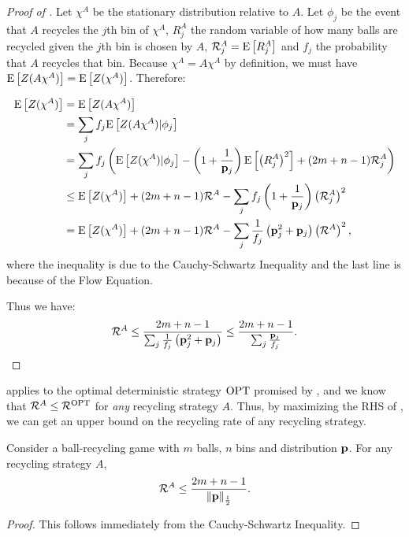 \begin{proof}[Proof of ]
	Let $\chi^A$ be the stationary distribution relative to $A$. Let $\phi_j$
	be the event that $A$ recycles the $j$th bin of $\chi^A$, $R_j^A$ the
	random variable of how many balls are recycled given the $j$th bin is
	chosen by $A$, $\mathcal{R}_j^A=\mathrm{E}\left[R_j^A\right]$ and $f_j$ the probability that
	$A$ recycles that bin.  Because $\chi^A = A\chi^A$ by definition, we must
	have $\mathrm{E}\left[Z(A\chi^A)\right] = \mathrm{E}\left[Z(\chi^A)\right]$. Therefore:

	\begin{align*}
	\mathrm{E}\left[Z(\chi^A)\right] &= \mathrm{E}\left[Z(A\chi^A)\right]\\
	  	      &= \sum_j f_j \mathrm{E}\left[Z(A\chi^A)|\phi_j\right] \\
		      &= \sum_j f_j \left(\mathrm{E}\left[Z(\chi^A)|\phi_j\right] - \left(1+\frac{1}{\mathbf{p}_j}\right)\mathrm{E}\left[\left(R_j^A\right)^2\right] + (2m+n-1)\mathcal{R}_j^A\right) \\
		      &\leq \mathrm{E}\left[Z(\chi^A)\right] + (2m+n-1)\mathcal{R}^A - \sum_j f_j\left(1 +\frac{1}{\mathbf{p}_j}\right)\left(\mathcal{R}_j^A\right)^2 \\
		      &= \mathrm{E}\left[Z(\chi^A)\right] + (2m+n-1)\mathcal{R}^A - \sum_j \frac{1}{f_j}\left(\mathbf{p}_j^2 +\mathbf{p}_j\right)\left(\mathcal{R}^A\right)^2,
	\end{align*}
	where the inequality is due to the Cauchy-Schwartz Inequality and the last
	line is because of the Flow Equation.
	
	Thus we have:
        \[ \mathcal{R}^A \leq \frac{2m+n-1}{\sum_j \frac{1}{f_j}\left(\mathbf{p}_j^2 +\mathbf{p}_j\right)} \leq \frac{2m+n-1}{\sum_j \frac{\mathbf{p}_j}{f_j}}. \]
\end{proof}

 applies to the optimal deterministic strategy $\textrm{OPT}$
promised by , and we know that $\mathcal{R}^A\leq
\mathcal{R}^{\textrm{OPT}}$ for \textit{any} recycling strategy $A$.  Thus, by maximizing
the RHS of , we can get an upper bound on the recycling
rate of any recycling strategy.

\begin{lemma}\label{lem:upperbound}
	Consider a ball-recycling game with $m$ balls, $n$ bins and distribution
	$\mathbf{p}$. For any recycling strategy $A$, 
	\[\mathcal{R}^A \leq \frac{2m+n-1}{\|\mathbf{p}\|_{\frac{1}{2}}}.\]
\end{lemma}

\begin{proof}
	This follows immediately from the Cauchy-Schwartz Inequality.
\end{proof}

